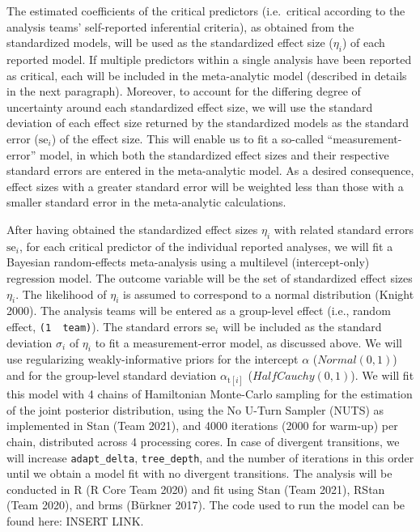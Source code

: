 \documentclass[
  12pt,
]{article}
\begin{document}
The estimated coefficients of the critical predictors (i.e.~critical according to the analysis teams' self-reported inferential criteria), as obtained from the standardized models, will be used as the standardized effect size (\(\eta_i\)) of each reported model.
If multiple predictors within a single analysis have been reported as critical, each will be included in the meta-analytic model (described in details in the next paragraph).
Moreover, to account for the differing degree of uncertainty around each standardized effect size, we will use the standard deviation of each effect size returned by the standardized models as the standard error (\(\text{se}_i\)) of the effect size.
This will enable us to fit a so-called ``measurement-error'' model, in which both the standardized effect sizes and their respective standard errors are entered in the meta-analytic model.
As a desired consequence, effect sizes with a greater standard error will be weighted less than those with a smaller standard error in the meta-analytic calculations.

After having obtained the standardized effect sizes \(\eta_i\) with related standard errors \(\text{se}_i\), for each critical predictor of the individual reported analyses, we will fit a Bayesian random-effects meta-analysis using a multilevel (intercept-only) regression model.
The outcome variable will be the set of standardized effect sizes \(\eta_i\).
The likelihood of \(\eta_i\) is assumed to correspond to a normal distribution (Knight 2000).
The analysis teams will be entered as a group-level effect (i.e., random effect, \texttt{(1\ \textbar{}\ team)}).
The standard errors \(\text{se}_i\) will be included as the standard deviation \(\sigma_i\) of \(\eta_i\) to fit a measurement-error model, as discussed above.
We will use regularizing weakly-informative priors for the intercept \(\alpha\) (\(Normal(0, 1)\)) and for the group-level standard deviation \(\alpha_{\text{t}[i]}\) (\(HalfCauchy(0, 1)\)).
We will fit this model with 4 chains of Hamiltonian Monte-Carlo sampling for the estimation of the joint posterior distribution, using the No U-Turn Sampler (NUTS) as implemented in Stan (Team 2021), and 4000 iterations (2000 for warm-up) per chain, distributed across 4 processing cores.
In case of divergent transitions, we will increase \texttt{adapt\_delta}, \texttt{tree\_depth}, and the number of iterations in this order until we obtain a model fit with no divergent transitions.
The analysis will be conducted in R (R Core Team 2020) and fit using Stan (Team 2021), RStan (Team 2020), and brms (Bürkner 2017).
The code used to run the model can be found here: INSERT LINK.
\end{document}
